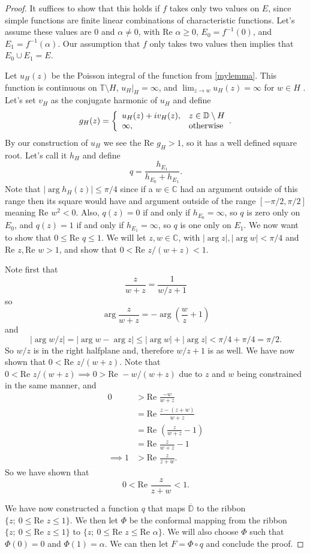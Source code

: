 \documentclass[a4paper,12pt,twoside,BCOR=10mm]{scrbook}
\theoremstyle{definition}
\theoremstyle{definition}
\theoremstyle{definition}
\renewcommand{\Re}{\text{Re }}
\begin{document}
\begin{proof}
It suffices to show that this holds if $f$ takes only two values on $E$, since simple functions are finite linear combinations of characteristic functions.
Let's assume these values are $0$ and $\alpha \neq 0$, with $\Re \alpha \geq 0$, $E_0 = f^{-1}(0)$, and $E_1 = f^{-1}(\alpha)$.
Our assumption that $f$ only takes two values then implies that $E_0 \cup E_1 = E$.

Let $u_H(z)$ be the Poisson integral of the function from \ref{mylemma}.
This function is continuous on $\mathbb{T} \setminus H$, $u_H|_H = \infty$, and $\lim_{z \rightarrow w} u_H(z) = \infty$ for $w \in H$ \citep[page $234$]{rudin2}.
Let's set $v_H$ as the conjugate harmonic of $u_H$ and define
\[
	g_H(z) =
	\left \{
		\begin{array}{l l}
		u_H(z) + iv_H(z), & z \in \mathbb{D} \setminus H\\
		\infty, & \text{otherwise}
		\end{array}.
	\right .
\]
By our construction of $u_H$ we see the $\Re g_H > 1$, so it has a well defined square root.
Let's call it $h_H$ and define
\[
	q = \frac{h_{E_1}}{h_{E_0} + h_{E_1}}.
\]
Note that $|\arg h_H(z)| \leq \pi/4$ since if a $w \in \mathbb{C}$ had an argument outside of this range then its square would have and argument outside of the range $[-\pi/2, \pi/2]$ meaning $\Re w^2 < 0$.
Also, $q(z) = 0$ if and only if $h_{E_0} = \infty$, so $q$ is zero only on $E_0$, and $q(z) = 1$ if and only if $h_{E_1} = \infty$, so $q$ is one only on $E_1$.
We now want to show that $0 \leq \Re q \leq 1$.
We will let $z, w \in \mathbb{C}$, with $|\arg z|, |\arg w| < \pi/4$ and $\Re z, \Re w > 1$, and show that $0 < \Re z/(w + z) < 1$.

Note first that
\[
	\frac{z}{w + z}
	=
	\frac{1}{w/z + 1}
\]
so 
\[
	\arg \frac{z}{w + z} = -\arg \left ( \frac{w}{z} + 1 \right )
\]
and
\[
	|\arg w/z| = |\arg w - \arg z| \leq |\arg w| + |\arg z| < \pi/4 + \pi/4 = \pi/2.
\]
So $w/z$ is in the right halfplane and, therefore $w/z + 1$ is as well.
We have now shown that $0 < \Re z/(w + z)$.
Note that $0 < \Re z/(w + z) \implies 0 > \Re -w/(w + z)$ due to $z$ and $w$ being constrained in the same manner, and
\begin{align*}
	0
	&> \Re \frac{-w}{w + z}\\
	&= \Re \frac{z - (z + w)}{w + z}\\
	&= \Re \left ( \frac{z}{w + z} - 1 \right )\\
	&= \Re \frac{z}{w + z} - 1\\
	\implies 1 &> \Re \frac{z}{z + w}.
\end{align*}
So we have shown that
\[
	0 < \Re \frac{z}{z + w} < 1.
\]

We have now constructed a function $q$ that maps $\overline{\mathbb{D}}$ to the ribbon $\{z;\ 0 \leq \Re z \leq 1\}$.
We then let $\Phi$ be the conformal mapping from the ribbon $\{z;\ 0 \leq \Re z \leq 1\}$ to $\{z;\ 0 \leq \Re z \leq \Re \alpha\}$.
We will also choose $\Phi$ such that $\Phi(0) = 0$ and $\Phi(1) = \alpha$.
We can then let $F = \Phi \circ q$ and conclude the proof.

\end{proof}
\end{document}
